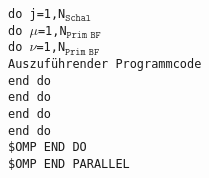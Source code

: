 \null\quad\texttt{do j=1,N$_{\texttt{Schal}}$}\\ 
\null\quad\quad\texttt{do $\mu$=1,N$_{\texttt{Prim BF}}$}\\ 
\null\quad\quad\quad\texttt{do $\nu$=1,N$_{\texttt{Prim BF}}$}\\
\null\quad\quad\quad\quad \texttt{Auszuführender Programmcode}\\ 
\null\quad\quad\quad\texttt{end do}\\ 
\null\quad\quad\texttt{end do}\\ 
\null\quad\texttt{end do}\\ 
\texttt{end do}\\
\texttt{\$OMP END DO}\\
\texttt{\$OMP END PARALLEL}\\
\\
